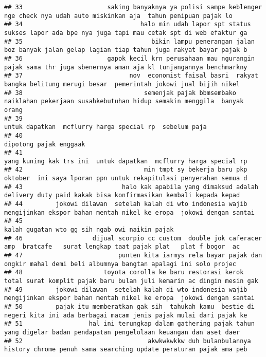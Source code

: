 \documentclass[
]{article}
\begin{document}
\begin{verbatim}
## 33                       saking banyaknya ya polisi sampe keblenger nge check nya udah auto miskinkan aja  tahun penipuan pajak lo  
## 34                                halo min udah lapor spt status sukses lapor ada bpe nya juga tapi mau cetak spt di web efaktur ga 
## 35                                   bikin lampu penerangan jalan boz banyak jalan gelap lagian tiap tahun juga rakyat bayar pajak b
## 36                       gapok kecil krn perusahaan mau ngurangin pajak sama thr juga sbenernya aman aja kl tunjangannya benchmarkny
## 37                             nov  economist faisal basri  rakyat bangka belitung merugi besar  pemerintah jokowi jual bijih nikel 
## 38                                 semenjak pajak bbmsembako naiklahan pekerjaan susahkebutuhan hidup semakin menggila  banyak orang
## 39                                                                          untuk dapatkan  mcflurry harga special rp  sebelum paja 
## 40                                                                                                            dipotong pajak enggaak
## 41                                                               yang kuning kak trs ini  untuk dapatkan  mcflurry harga special rp 
## 42                                 min tmpt sy bekerja baru pkp  oktober  ini saya lporan ppn untuk rekapitulasi penyerahan semua d 
## 43                           halo kak apabila yang dimaksud adalah delivery duty paid kakak bisa konfirmasikan kembali kepada kepad 
## 44         jokowi dilawan  setelah kalah di wto indonesia wajib mengijinkan ekspor bahan mentah nikel ke eropa  jokowi dengan santai
## 45                                                                                   kalah gugatan wto gg sih ngab owi naikin pajak 
## 46                   dijual scorpio cc custom  double jok caferacer amp  bratcafe   surat lengkap taat pajak plat   plat f bogor  ac
## 47                          punten kita iarmys rela bayar pajak dan ongkir mahal demi beli albumnya bangtan apalagi ini solo projec 
## 48                      toyota corolla ke baru restorasi kerok total surat komplit pajak baru bulan juli kemarin ac dingin mesin gak
## 49         jokowi dilawan  setelah kalah di wto indonesia wajib mengijinkan ekspor bahan mentah nikel ke eropa  jokowi dengan santai
## 50         pajak itu memberatkan gak sih  tahukah kamu  bestie di negeri kita ini ada berbagai macam jenis pajak mulai dari pajak ke
## 51                  hal ini terungkap dalam gathering pajak tahun  yang digelar badan pendapatan pengelolaan keuangan dan aset daer 
## 52                                  akwkwkwkkw duh bulanbulannya history chrome penuh sama searching update peraturan pajak ama peb 

\end{verbatim}
\end{document}
